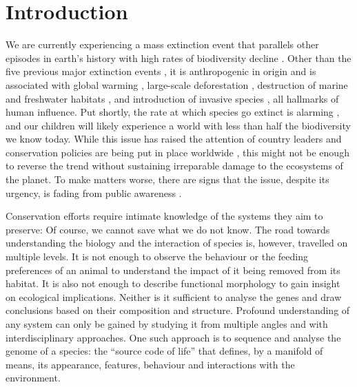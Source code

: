 \chapter{Introduction}
\label{introduction}

We are currently experiencing a mass extinction event that parallels
other episodes in earth's history with high rates of biodiversity
decline \citep{Pimm1995, Dirzo2003, Schipper2008, Barnosky2011,
Dirzo2014}. Other than the five previous major extinction events
\citep{Kolbert2014}, it is anthropogenic in origin \citep{Leakey1996,
Ceballos2015} and is associated with global warming \citep{Cook2016,
Wuebbles2017}, large-scale deforestation \citep{Wright2005}, destruction
of marine and freshwater habitats \citep{Burkhead2012}, and introduction
of invasive species \citep{Mooney2001}, all hallmarks of human
influence. Put shortly, the rate at which species go extinct is alarming
\citep{Newbold2016, Ceballos2017, Hallmann2017}, and our children will
likely experience a world with less than half the biodiversity we know
today. While this issue has raised the attention of country leaders and
conservation policies are being put in place worldwide
\citep{Puntaru2017}, this might not be enough to reverse the trend
without sustaining irreparable damage to the ecosystems of the planet.
To make matters worse, there are signs that the issue, despite its
urgency, is fading from public awareness \citep{Kusmanoff2017}. 

Conservation efforts require intimate knowledge of the systems they aim
to preserve: Of course, we cannot save what we do not know. The road
towards understanding the biology and the interaction of species is,
however, travelled on multiple levels. It is not enough to observe the
behaviour or the feeding preferences of an animal to understand the
impact of it being removed from its habitat. It is also not enough to
describe functional morphology to gain insight on ecological
implications. Neither is it sufficient to analyse the genes and draw
conclusions based on their composition and structure. Profound
understanding of any system can only be gained by studying it from
multiple angles and with interdisciplinary approaches. One such approach
is to sequence and analyse the genome of a species: the ``source code of
life'' that defines, by a manifold of means, its appearance, features,
behaviour and interactions with the environment.

